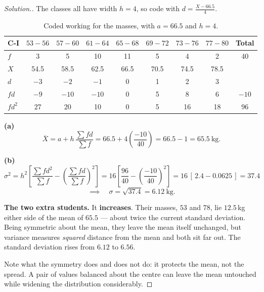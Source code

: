 \documentclass[11pt,a4paper]{article}
\theoremstyle{definition}
\newenvironment{solution}
  {\renewcommand{\qedsymbol}{}\begin{proof}[\textit{Solution}.]}
  {\end{proof}}
\begin{document}
\begin{solution}
The classes all have width $h=4$, so code with $d=\frac{X-66.5}{4}$.
\begin{table}[H]
\centering
\begin{tabular}{|l|c|c|c|c|c|c|c|c|}
\hline
C-I & $53-56$ & $57-60$ & $61-64$ & $65-68$ & $69-72$ & $73-76$ & $77-80$ & Total\\
\hline
$f$ & 3 & 5 & 10 & 11 & 5 & 4 & 2 & 40\\
$X$ & 54.5 & 58.5 & 62.5 & 66.5 & 70.5 & 74.5 & 78.5 & \\
$d$ & $-3$ & $-2$ & $-1$ & 0 & 1 & 2 & 3 & \\
$fd$ & $-9$ & $-10$ & $-10$ & 0 & 5 & 8 & 6 & $-10$\\
$fd^2$ & 27 & 20 & 10 & 0 & 5 & 16 & 18 & 96\\
\hline
\end{tabular}
\caption{Coded working for the masses, with $a=66.5$ and $h=4$.}
\end{table}

\textbf{(a)}
\[\overline{X}=a+h\,\frac{\sum fd}{\sum f}=66.5+4\left(\frac{-10}{40}\right)=66.5-1=65.5\ \text{kg}.\]

\textbf{(b)}
\[\sigma^2=h^2\left[\frac{\sum fd^2}{\sum f}-\left(\frac{\sum fd}{\sum f}\right)^{2}\right]
=16\left[\frac{96}{40}-\left(\frac{-10}{40}\right)^{2}\right]=16\,[\,2.4-0.0625\,]=37.4\]
\[\implies\quad \sigma=\sqrt{37.4}=6.12\ \text{kg}.\]

\textbf{The two extra students.} It \textbf{increases}. Their masses, $53$ and $78$, lie
$12.5$\,kg either side of the mean of $65.5$ --- about twice the current standard deviation.
Being symmetric about the mean, they leave the mean itself unchanged, but variance measures
\emph{squared} distance from the mean and both sit far out. The standard deviation rises
from $6.12$ to $6.56$.

Note what the symmetry does and does not do: it protects the mean, not the spread. A pair of
values balanced about the centre can leave the mean untouched while widening the
distribution considerably.
\end{solution}
\end{document}
